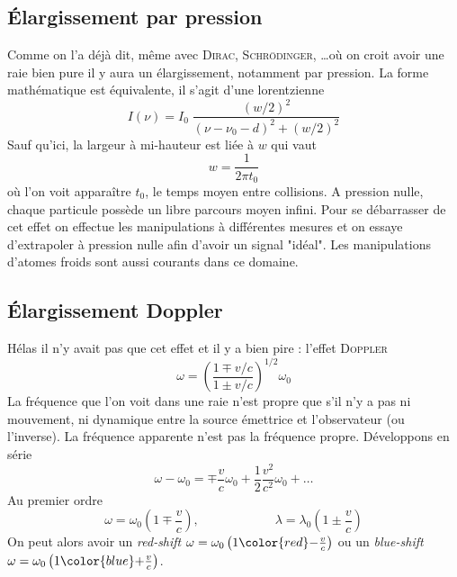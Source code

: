 \subsection{Élargissement par pression}
Comme on l'a déjà dit, même avec \textsc{Dirac, Schrödinger}, \dots où on croit avoir une raie bien
pure il y aura un élargissement, notamment par pression. La forme mathématique est équivalente, il
s'agit d'une lorentzienne
\begin{equation}
I(\nu) = I_0 \; \frac{ (w/2 )^2}
{ (\nu - \nu_0 - d )^2 + (w/2 )^2 }
\end{equation}
Sauf qu'ici, la largeur à mi-hauteur est liée à $w$ qui vaut
\begin{equation}
w =  \frac{1}{ 2 \pi t_0}
\end{equation}
où l'on voit apparaître $t_0$, le temps moyen entre collisions. A pression nulle, chaque particule 
possède un libre parcours moyen infini. Pour se débarrasser de cet effet on effectue les manipulations
à différentes mesures et on essaye d'extrapoler à pression nulle afin d'avoir un signal "idéal". Les
manipulations d'atomes froids sont aussi courants dans ce domaine.


\subsection{Élargissement Doppler}
Hélas il n'y avait pas que cet effet et il y a bien pire : l'effet \textsc{Doppler}
\begin{equation}
\omega = \left(
\frac{1 \mp v/c}{1 \pm v/c} \right) ^{1/2} \omega_0
\end{equation}
La fréquence que l'on voit dans une raie n'est propre que s'il n'y a pas ni mouvement, ni dynamique
entre la source émettrice et l'observateur (ou l'inverse). La fréquence apparente n'est pas la 
fréquence propre. Développons en série
\begin{equation}
\omega - \omega_0 = \mp \frac{v}{c} \omega_0
+ \frac{1}{2} \frac{v^2}{c^2} \omega_0 + \ldots
\end{equation}
Au premier ordre
\begin{equation}
\omega = \omega_0 \left( 1 \mp \frac{v}{c} \right),\qquad\qquad\qquad
\lambda = \lambda_0 \left( 1 \pm \frac{v}{c} \right)
\end{equation}
On peut alors avoir un \textit{red-shift} $\omega = \omega_0 \left( 1 {\color{red} - } 
\frac{v}{c} \right)$ ou un \textit{blue-shift} $\omega = \omega_0 \left( 1 {\color{blue} + } 
\frac{v}{c} \right)$.\\


